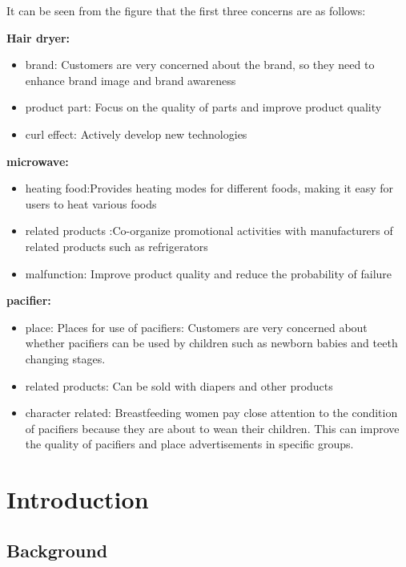 \documentclass[12pt,a4paper,]{article}
\providecommand{\tightlist}{%
  \setlength{\itemsep}{0pt}\setlength{\parskip}{0pt}}
\begin{document}
It can be seen from the figure that the first three concerns are as
follows:

\textbf{Hair dryer:}

\begin{itemize}
\tightlist
\item
  brand: Customers are very concerned about the brand, so they need to
  enhance brand image and brand awareness
\item
  product part: Focus on the quality of parts and improve product
  quality
\item
  curl effect: Actively develop new technologies
\end{itemize}

\textbf{microwave:}

\begin{itemize}
\tightlist
\item
  heating food:Provides heating modes for different foods, making it
  easy for users to heat various foods
\item
  related products :Co-organize promotional activities with
  manufacturers of related products such as refrigerators
\item
  malfunction: Improve product quality and reduce the probability of
  failure
\end{itemize}

\textbf{pacifier:}

\begin{itemize}
\tightlist
\item
  place: Places for use of pacifiers: Customers are very concerned about
  whether pacifiers can be used by children such as newborn babies and
  teeth changing stages.
\item
  related products: Can be sold with diapers and other products
\item
  character related: Breastfeeding women pay close attention to the
  condition of pacifiers because they are about to wean their children.
  This can improve the quality of pacifiers and place advertisements in
  specific groups.
\end{itemize}

\newpage

\hypertarget{introduction}{%
\section{Introduction}\label{introduction}}

\hypertarget{background}{%
\subsection{Background}\label{background}}
\end{document}
